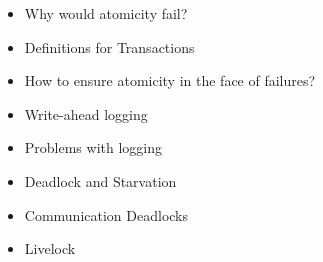 \documentclass[12pt]{article}
\begin{document}
\begin{itemize}
    \item Why would atomicity fail?
    \item Definitions for Transactions
    \item How to ensure atomicity in the face of failures?
    \item Write-ahead logging
    \item Problems with logging
    \item Deadlock and Starvation
    \item Communication Deadlocks
    \item Livelock
\end{itemize}
\end{document}
